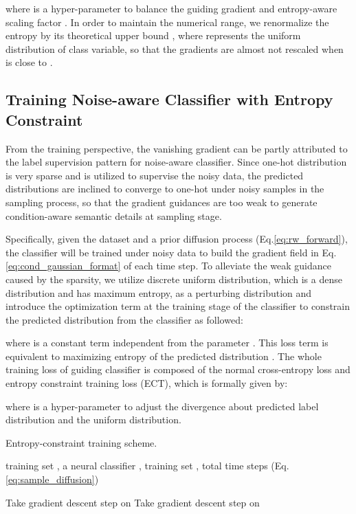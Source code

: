 \documentclass[runningheads]{llncs}
\begin{document}
where 
 is a hyper-parameter to balance the guiding gradient and entropy-aware scaling factor .
In order to maintain the numerical range, we renormalize the entropy by its theoretical upper bound , where  represents the uniform distribution of class variable, so that the gradients are almost not rescaled when  is close to .










\subsection{Training Noise-aware Classifier with Entropy Constraint}
\label{md:ect}
From the training perspective, the vanishing gradient can be partly attributed to the label supervision pattern for noise-aware classifier.
Since one-hot distribution is very sparse and is utilized to supervise the noisy data, the predicted distributions are inclined to converge to one-hot under noisy samples in the sampling process, so that the gradient guidances are too weak to generate condition-aware semantic details at sampling stage.








Specifically, given the dataset  and a prior diffusion process (Eq.\eqref{eq:rw_forward}), the classifier will be trained under noisy data  to build the gradient field in Eq.\eqref{eq:cond_gaussian_format} of each time step.
To alleviate the weak guidance caused by the sparsity, we utilize discrete uniform distribution, which is a dense distribution and has maximum entropy, as a perturbing distribution and introduce the optimization term at the training stage of the classifier to constrain the predicted distribution from the classifier as followed:

where  is a constant term independent from the parameter .
This loss term is equivalent to maximizing entropy of the predicted distribution .
The whole training loss of guiding classifier is composed of the normal cross-entropy loss and entropy constraint training loss (ECT), which is formally given by:

where  is a hyper-parameter to adjust the divergence about
predicted label distribution and the uniform distribution.
\begin{algorithm}[!t]
    \caption{\small{Entropy-constraint training scheme.
    }}
    \label{alg:entropy_constraint_train}
    
    \begin{algorithmic}[1]
        \Require training set , a neural classifier , training set , total time steps 
        \Repeat
            \State 
            \State 
            \State  (Eq.\ref{eq:sample_diffusion})
            \State 
            
                \State 
                \State Take gradient descent step on 
            \Else
                \State Take gradient descent step on 
            \EndIf
\end{algorithmic}
\end{algorithm}
 
\end{document}
